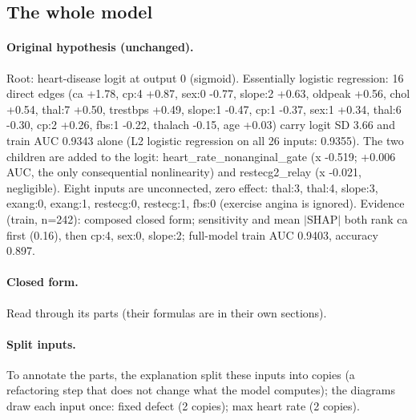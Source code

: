 \documentclass[a4paper,10pt]{article}
\newif\ifreviewmarks
\newcommand{\reviewrule}{\noindent{\color{BrickRed}\rule{\linewidth}{0.8pt}}}
\newenvironment{drafted}[1][]{%
  \ifreviewmarks\par\addvspace{\medskipamount}\reviewrule\par\nopagebreak
  \noindent{\color{BrickRed}\sffamily\footnotesize\textbf{Thesis Draft}\quad #1\hfill review}\par\nopagebreak\smallskip\fi}{%
  \ifreviewmarks\par\smallskip\noindent{\color{BrickRed}\sffamily\footnotesize end of thesis draft}\par\nopagebreak\reviewrule\par\medskip\fi}
\begin{document}
\begin{drafted}[plain-language layer: heart-s2-c2]
\subsection{The whole model}\label{tech:ann30}
\paragraph{Original hypothesis (unchanged).} Root: heart-disease logit at output 0 (sigmoid). Essentially logistic regression: 16 direct edges (ca +1.78, cp:4 +0.87, sex:0 -0.77, slope:2 +0.63, oldpeak +0.56, chol +0.54, thal:7 +0.50, trestbps +0.49, slope:1 -0.47, cp:1 -0.37, sex:1 +0.34, thal:6 -0.30, cp:2 +0.26, fbs:1 -0.22, thalach -0.15, age +0.03) carry logit SD 3.66 and train AUC 0.9343 alone (L2 logistic regression on all 26 inputs: 0.9355). The two children are added to the logit: heart\_\allowbreak{}rate\_\allowbreak{}nonanginal\_\allowbreak{}gate (x -0.519; +0.006 AUC, the only consequential nonlinearity) and restecg2\_\allowbreak{}relay (x -0.021, negligible). Eight inputs are unconnected, zero effect: thal:3, thal:4, slope:3, exang:0, exang:1, restecg:0, restecg:1, fbs:0 (exercise angina is ignored). Evidence (train, n=242): composed closed form; sensitivity and mean $|$SHAP$|$ both rank ca first (0.16), then cp:4, sex:0, slope:2; full-model train AUC 0.9403, accuracy 0.897.
\paragraph{Closed form.} Read through its parts (their formulas are in their own sections).
\paragraph{Split inputs.} To annotate the parts, the explanation split these inputs into copies (a refactoring step that does not change what the model computes); the diagrams draw each input once: fixed defect (2 copies); max heart rate (2 copies).

\end{drafted}
\end{document}
